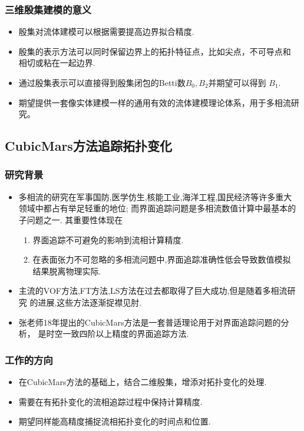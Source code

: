 \documentclass[UTF8]{ctexbeamer}	%
\theoremstyle{plain}
\theoremstyle{definition}
\theoremstyle{remark}
\numberwithin{equation}{section}
\begin{document}
\begin{frame}
    \frametitle{三维殷集建模的意义}
    \begin{itemize}
        \item 殷集对流体建模可以根据需要提高边界拟合精度.
        \item 殷集的表示方法可以同时保留边界上的拓扑特征点，比如尖点，不可导点和
        相切或粘在一起边界.
        \item 通过殷集表示可以直接得到殷集闭包的Betti数$B_0, B_2$并期望可以得到
        $B_1$.
        \item 期望提供一套像实体建模一样的通用有效的流体建模理论体系，用于多相流研究。
    \end{itemize}
\end{frame}

\subsection{CubicMars方法追踪拓扑变化}
\begin{frame}
    \frametitle{研究背景}
    \begin{itemize}
        \item 多相流的研究在军事国防,医学仿生,核能工业,海洋工程,国民经济等许多重大
        领域中都占有举足轻重的地位; 而界面追踪问题是多相流数值计算中最基本的子问题之一.
        其重要性体现在
        \begin{enumerate}
            \item 界面追踪不可避免的影响到流相计算精度.
            \item 在表面张力不可忽略的多相流问题中,界面追踪准确性低会导致数值模拟
            结果脱离物理实际.
        \end{enumerate}
        \item 主流的VOF方法,FT方法,LS方法在过去都取得了巨大成功,但是随着多相流研究
        的进展,这些方法逐渐捉襟见肘.
        \item 张老师18年提出的CubicMars方法是一套普适理论用于对界面追踪问题的分析，
        是时空一致四阶以上精度的界面追踪方法.
    \end{itemize}
    
\end{frame}

\begin{frame}
    \frametitle{工作的方向} 
    \begin{itemize}
        \item 在CubicMars方法的基础上，结合二维殷集，增添对拓扑变化的处理.
        \item 需要在有拓扑变化的流相追踪过程中保持计算精度.
        \item 期望同样能高精度捕捉流相拓扑变化的时间点和位置.
    \end{itemize}
\end{frame}
\end{document}
